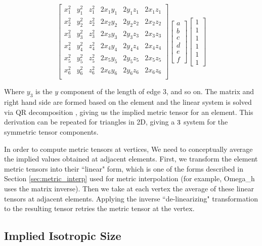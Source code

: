 \begin{equation}
\begin{bmatrix}
x_1^2 & y_1^2 & z_1^2 & 2x_1y_1 & 2y_1z_1 & 2x_1z_1 \\
x_2^2 & y_2^2 & z_2^2 & 2x_2y_2 & 2y_2z_2 & 2x_2z_2 \\
x_3^2 & y_3^2 & z_3^2 & 2x_3y_3 & 2y_3z_3 & 2x_3z_3 \\
x_4^2 & y_4^2 & z_4^2 & 2x_4y_4 & 2y_4z_4 & 2x_4z_4 \\
x_5^2 & y_5^2 & z_5^2 & 2x_5y_5 & 2y_5z_5 & 2x_5z_5 \\
x_6^2 & y_6^2 & z_6^2 & 2x_6y_6 & 2y_6z_6 & 2x_6z_6 \\
\end{bmatrix}
\begin{bmatrix}
a \\ b \\ c \\ d \\ e \\ f
\end{bmatrix}
\begin{bmatrix}
1 \\ 1 \\ 1 \\ 1 \\ 1 \\ 1
\end{bmatrix}
\end{equation}

Where $y_3$ is the $y$ component of the length of edge 3,
and so on.
The matrix and right hand side are formed based on the element
and the linear system is solved via QR decomposition
\cite{trefethen1997numerical}, giving us
the implied metric tensor for an element.
This derivation can be repeated for triangles in 2D, giving
a $3\time 3$ system for the symmetric tensor components.

In order to compute metric tensors at vertices,
We need to conceptually average the implied values obtained
at adjacent elements.
First, we transform the element metric tensors into their
``linear" form, which is one of the forms described
in Section \ref{sec:metric_interp} used for metric interpolation
(for example, Omega\_h uses the matrix inverse).
Then we take at each vertex the average of these linear
tensors at adjacent elements.
Applying the inverse ``de-linearizing" transformation to the resulting tensor
retries the metric tensor at the vertex.

\subsection{Implied Isotropic Size}
\label{sec:ident_size}

